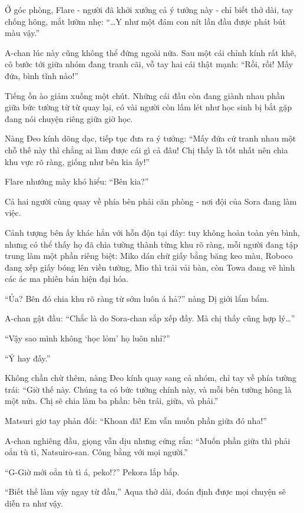 \documentclass[../main.tex]{subfiles}
\begin{document}
Ở góc phòng, Flare - người đã khởi xướng cả ý tưởng này - chỉ biết thở dài, tay chống hông, mắt lườm nhẹ: ``\dots Y như một đám con nít lần đầu được phát bút màu vậy.''

A-chan lúc này cũng không thể đứng ngoài nữa. Sau một cái chỉnh kính rất khẽ, cô bước tới giữa nhóm đang tranh cãi, vỗ tay hai cái thật mạnh: ``Rồi, rồi! Mấy đứa, bình tĩnh nào!''

Tiếng ồn ào giảm xuống một chút. Những cái đầu còn đang giành nhau phần giữa bức tường từ từ quay lại, có vài người còn lấm lét như học sinh bị bắt gặp đang nói chuyện riêng giữa giờ học.

Nàng Đeo kính dõng dạc, tiếp tục đưa ra ý tưởng: ``Mấy đứa cứ tranh nhau một chỗ thế này thì chẳng ai làm được cái gì cả đâu! Chị thấy là tốt nhất nên chia khu vực rõ ràng, giống như bên kia ấy!''

Flare nhướng mày khó hiểu: ``Bên kia?''

Cả hai người cùng quay về phía bên phải căn phòng - nơi đội của Sora đang làm việc.

Cảnh tượng bên ấy khác hẳn với hỗn độn tại đây: tuy không hoàn toàn yên bình, nhưng có thể thấy họ đã chia tường thành từng khu rõ ràng, mỗi người đang tập trung làm một phần riêng biệt: Miko dán chữ giấy bằng băng keo màu, Roboco đang xếp giấy bóng lên viền tường, Mio thì trải vải bàn, còn Towa đang vẽ hình các ác ma phiên bản hiện đại hóa.

``Ủa? Bên đó chia khu rõ ràng từ sớm luôn á hả?'' nàng Dị giới lẩm bẩm.

A-chan gật đầu: ``Chắc là do Sora-chan sắp xếp đấy. Mà chị thấy cũng hợp lý\dots''

``Vậy sao mình không `học lỏm' họ luôn nhỉ?''

``Ý hay đấy.''

Không chần chừ thêm, nàng Đeo kính quay sang cả nhóm, chỉ tay về phía tường trái: ``Giờ thế này. Chúng ta có bức tường chính này, và mỗi bên tường hông là một nửa. Chị sẽ chia làm ba phần: bên trái, giữa, và phải.''

Matsuri giơ tay phản đối: ``Khoan đã! Em vẫn muốn phần giữa đó nha!''

A-chan nghiêng đầu, giọng vẫn dịu nhưng cứng rắn: ``Muốn phần giữa thì phải oẳn tù tì, Natsuiro-san. Công bằng với mọi người.''

``G-Giờ mới oẳn tù tì á, peko!?'' Pekora lắp bắp.

``Biết thế làm vậy ngay từ đầu,'' Aqua thở dài, đoán định được mọi chuyện sẽ diễn ra như vậy.
\end{document}
